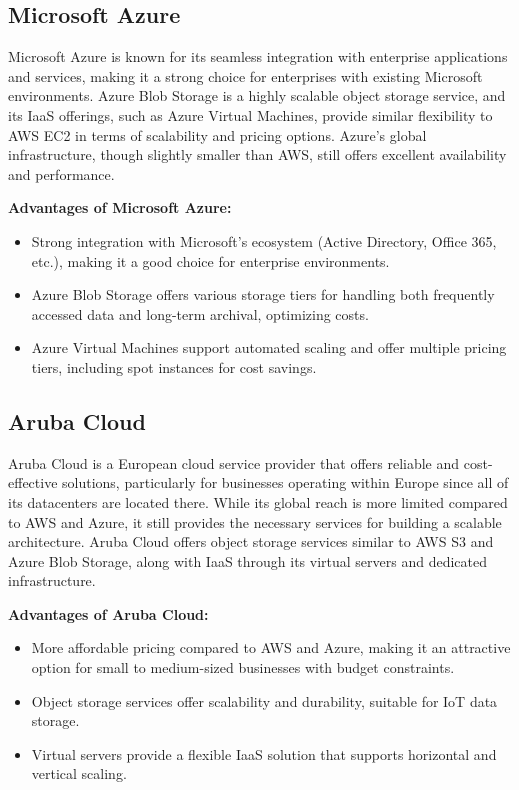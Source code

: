 \subsection*{Microsoft Azure}
Microsoft Azure is known for its seamless integration with enterprise applications and services, making it a strong choice for enterprises with existing Microsoft environments. Azure Blob Storage is a highly scalable object storage service, and its IaaS offerings, such as Azure Virtual Machines, provide similar flexibility to AWS EC2 in terms of scalability and pricing options. Azure's global infrastructure, though slightly smaller than AWS, still offers excellent availability and performance.

\textbf{Advantages of Microsoft Azure:}
\begin{itemize}
    \item Strong integration with Microsoft’s ecosystem (Active Directory, Office 365, etc.), making it a good choice for enterprise environments.
    \item Azure Blob Storage offers various storage tiers for handling both frequently accessed data and long-term archival, optimizing costs.
    \item Azure Virtual Machines support automated scaling and offer multiple pricing tiers, including spot instances for cost savings.
\end{itemize}

\subsection*{Aruba Cloud}
Aruba Cloud is a European cloud service provider that offers reliable and cost-effective solutions, particularly for businesses operating within Europe since all of its datacenters are located there. While its global reach is more limited compared to AWS and Azure, it still provides the necessary services for building a scalable architecture. Aruba Cloud offers object storage services similar to AWS S3 and Azure Blob Storage, along with IaaS through its virtual servers and dedicated infrastructure.

\textbf{Advantages of Aruba Cloud:}
\begin{itemize}
    \item More affordable pricing compared to AWS and Azure, making it an attractive option for small to medium-sized businesses with budget constraints.
    \item Object storage services offer scalability and durability, suitable for IoT data storage.
    \item Virtual servers provide a flexible IaaS solution that supports horizontal and vertical scaling.
\end{itemize}

